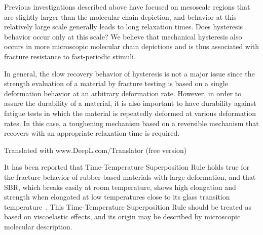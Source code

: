 \documentclass[uplatex,dvipdfmx,a4paper,10pt]{jsarticle}
\makeatletter
\def\subsection{\@startsection{subsection}{2}{\z@}{0.2\Cvs \@plus.5\Cdp \@minus.2\Cdp}{0.1\Cvs \@plus.3\Cdp}{\reset@font\normalsize\bfseries}}
\makeatother
\begin{document}
Previous investigations described above have focused on mesoscale regions that are slightly larger than the molecular chain depiction, and behavior at this relatively large scale generally leads to long relaxation times.
Does hysteresis behavior occur only at this scale?
We believe that mechanical hysteresis also occurs in more microscopic molecular chain depictions and is thus associated with fracture resistance to fast-periodic stimuli.

In general, the slow recovery behavior of hysteresis is not a major issue since the strength evaluation of a material by fracture testing is based on a single deformation behavior at an arbitrary deformation rate.
However, in order to assure the durability of a material, it is also important to have durability against fatigue tests in which the material is repeatedly deformed at various deformation rates.
In this case, a toughening mechanism based on a reversible mechanism that recovers with an appropriate relaxation time is required.

Translated with www.DeepL.com/Translator (free version)

\subsection{破壊にたいする粘弾性効果}

It has been reported that Time-Temperature Superposition Rule holds true for the fracture behavior of rubber-based materials with large deformation, and that SBR, which breaks easily at room temperature, shows high elongation and strength when elongated at low temperatures close to its glass transition temperature~\cite{smith}.
This Time-Temperature Superposition Rule should be treated as based on viscoelastic effects, and its origin may be described by microscopic molecular description.
\end{document}
